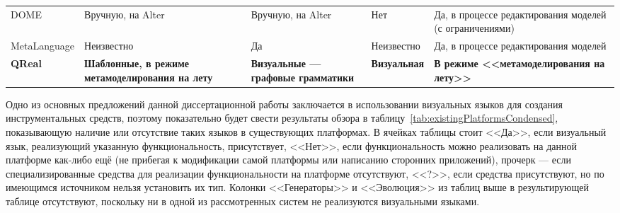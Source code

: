 \begin{table}[ht]
\begin{small}
\begin{longtabu} {| X[1 l p] | X[1 l p] | X[1 l p] | X[1 l p] | X[1 l p] |}
		DOME                         & Вручную, на Alter                                      & Вручную, на Alter                             & Нет                                                 & Да, в процессе редактирования моделей (с ограничениями)       \\
		MetaLanguage                 & Неизвестно                                             & Да                                            & Неизвестно                                          & Да, в процессе редактирования моделей                         \\
		\textbf{QReal}               & \textbf{Шаблонные, в режиме метамоделирования на лету} & \textbf{Визуальные --- графовые грамматики}   & \textbf{Визуальная}                                 & \textbf{В режиме <<метамоделирования на лету>>}               
		\label{tab:existingPlatformsAdditional}
	\end{longtabu}
\end{small}
\end{table}

Одно из основных предложений данной диссертационной работы заключается в использовании
визуальных языков для создания инструментальных средств, поэтому показательно будет свести
результаты обзора в таблицу~\ref{tab:existingPlatformsCondensed}, показывающую наличие или отсутствие таких языков
в существующих платформах. В ячейках таблицы
стоит <<Да>>, если визуальный язык, реализующий указанную функциональность, присутствует, <<Нет>>, если
функциональность можно реализовать на данной платформе как-либо ещё (не прибегая к модификации
самой платформы или написанию сторонних приложений), прочерк --- если специализированные 
средства для реализации функциональности на платформе отсутствуют, <<?>>, если средства присутствуют,
но по имеющимся источником нельзя установить их тип. Колонки <<Генераторы>> и <<Эволюция>>
из таблиц выше в результирующей таблице отсутствуют, поскольку ни в одной из рассмотренных 
систем не реализуются визуальными языками.


